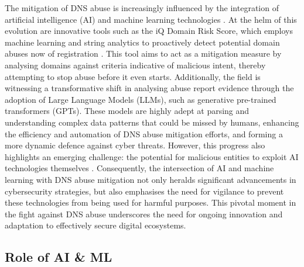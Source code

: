 The mitigation of DNS abuse is increasingly influenced by the integration of artificial intelligence (AI) and machine learning technologies \cite{goethals2021enabling}. At the helm of this evolution are innovative tools such as the iQ Domain Risk Score, which employs machine learning and string analytics to proactively detect potential domain abuses now of registration \cite{dnsabuseAI2023}. This tool aims to act as a mitigation measure by analysing domains against criteria indicative of malicious intent, thereby attempting to stop abuse before it even starts. Additionally, the field is witnessing a transformative shift in analysing abuse report evidence through the adoption of Large Language Models (LLMs), such as generative pre-trained transformers (GPTs). These models are highly adept at parsing and understanding complex data patterns that could be missed by humans, enhancing the efficiency and automation of DNS abuse mitigation efforts, and forming a more dynamic defence against cyber threats. However, this progress also highlights an emerging challenge: the potential for malicious entities to exploit AI technologies themselves \cite{halvorsenAI2023}.  Consequently, the intersection of AI and machine learning with DNS abuse mitigation not only heralds significant advancements in cybersecurity strategies, but also emphasises the need for vigilance to prevent these technologies from being used for harmful purposes. This pivotal moment in the fight against DNS abuse underscores the need for ongoing innovation and adaptation to effectively secure digital ecosystems.

\subsection{Role of AI \& ML}

